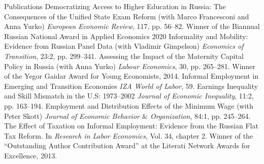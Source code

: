 
\def\arraystretch{1.3}
\begin{rubric}{Publications}
\entry*[2019] Democratizing Access to Higher Education in Russia: The Consequences of the Unified State Exam Reform (with Marco Francesconi and Anna Yurko) \newline
                \emph{European Economic Review}, 117, pp. 56--82. \newline
                Winner of the Biannual Russian National Award in Applied Economics 2020
\entry*[2015] Informality and Mobility: Evidence from Russian Panel Data (with Vladimir Gimpelson) \newline
                \emph{Economics of Transition}, 23:2, pp. 299--341.
\entry*[2014] Assessing the Impact of the Maternity Capital Policy in Russia (with Anna Yurko) \newline
                \emph{Labour Economics}, 30, pp. 265--281. \newline
                Winner of the Yegor Gaidar Award for Young Economists, 2014.
\entry*[2014/22] Informal Employment in Emerging and Transition Economies \newline
                \emph{IZA World of Labor}, 59.
\entry*[2013] Earnings Inequality and Skill Mismatch in the U.S: 1973--2002 \newline
                \emph{Journal of Economic Inequality}, 11:2, pp. 163--194.
\entry*[2012] Employment and Distribution Effects of the Minimum Wage (with Peter Skott)\newline
                \emph{Journal of Economic Behavior $\&$ Organization}, 84:1, pp. 245--264.
\entry*[2012] The Effect of Taxation on Informal Employment: Evidence from the Russian Flat Tax Reform. In \emph{Research in Labor Economics}, Vol. 34, chapter 2.\newline
                Winner of the ``Outstanding Author Contribution Award'' at the Literati Network Awards for Excellence, 2013.
\end{rubric}
